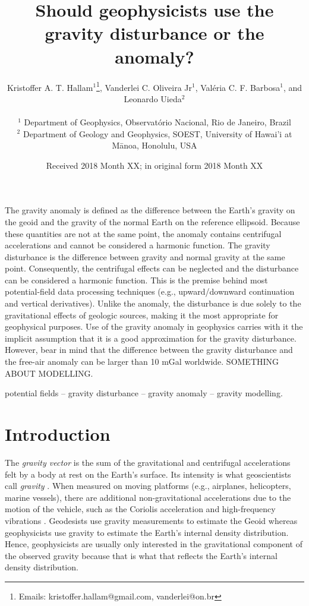 \documentclass[extra]{gji}
\title[Gravity anomaly or gravity disturbance?]
      {Should geophysicists use the gravity disturbance or the anomaly?}
\author[Hallam et al.]{
\parbox{\linewidth}{%
    Kristoffer A. T. Hallam$^{1}$\thanks{Emails: kristoffer.hallam@gmail.com, vanderlei@on.br},
    Vanderlei C. Oliveira Jr$^1$,
    Val\'{e}ria C. F. Barbosa$^1$, and \linebreak Leonardo Uieda$^2$
    \vspace{0.3cm}
}%
    \\
    $^1$ Department of Geophysics, Observat\'{o}rio Nacional, Rio de Janeiro, Brazil \\
    $^2$ Department of Geology and Geophysics, SOEST, University of Hawai'i at M\={a}noa, Honolulu, USA
}
\date{Received 2018 Month XX; in original form 2018 Month XX}
\begin{document}
\label{firstpage}

\maketitle


\begin{summary}
 The gravity anomaly is defined as the difference between the Earth's gravity
 on the geoid and the gravity of the normal Earth on the reference ellipsoid.
 Because these quantities are not at the same point, the anomaly contains
 centrifugal accelerations and cannot be considered a harmonic function.
 The gravity disturbance is the difference between gravity and normal gravity
 at the same point.
 Consequently, the centrifugal effects can be neglected and the disturbance can
 be considered a harmonic function.
 This is the premise behind most potential-field data processing techniques
 (e.g., upward/downward continuation and vertical derivatives).
 Unlike the anomaly, the disturbance is due solely to the
 gravitational effects of geologic sources, making it the most appropriate
 for geophysical purposes.
 Use of the gravity anomaly in geophysics carries with it the implicit
 assumption that it is a good approximation for the gravity disturbance.
 However, bear in mind that the difference between the gravity disturbance and
 the free-air anomaly can be larger than 10 mGal worldwide.
 SOMETHING ABOUT MODELLING.
\end{summary}

\begin{keywords}
 potential fields -- gravity disturbance -- gravity anomaly -- gravity modelling.
\end{keywords}


\section{Introduction}

The \textit{gravity vector} is the sum of the gravitational and centrifugal
accelerations felt by a body at rest on the Earth's surface.
Its intensity is what geoscientists call \textit{gravity}
\citep{heiskanen-moritz1967, hofmann-wellenhof-moritz2005}.
When measured on moving platforms (e.g., airplanes,
helicopters, marine vessels), there are additional
non-gravitational accelerations due to the motion of the vehicle,
such as the Coriolis acceleration and high-frequency vibrations
\citep{glennie-etal2000,nabighian-etal2005-grav,baumann-etal2012}.
Geodesists use gravity measurements to estimate the Geoid \citep{li2001}
whereas geophysicists use gravity to estimate the Earth's
internal density distribution.
Hence, geophysicists are usually only interested
in the gravitational component of the observed gravity
because that is what that reflects the Earth's internal density distribution.
\end{document}
